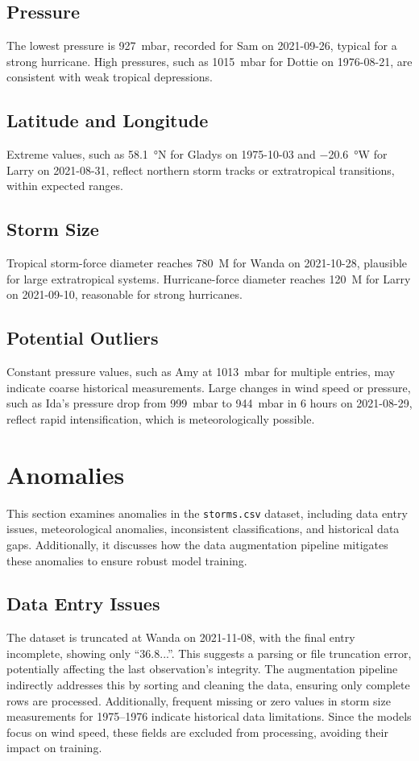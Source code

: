 \subsection{Pressure}
The lowest pressure is \SI{927}{\milli\bar}, recorded for Sam on 2021-09-26, typical for a strong hurricane. High pressures, such as \SI{1015}{\milli\bar} for Dottie on 1976-08-21, are consistent with weak tropical depressions.

\subsection{Latitude and Longitude}
Extreme values, such as \SI{58.1}{\degree}N for Gladys on 1975-10-03 and \SI{-20.6}{\degree}W for Larry on 2021-08-31, reflect northern storm tracks or extratropical transitions, within expected ranges.

\subsection{Storm Size}
Tropical storm-force diameter reaches \SI{780}{\nauticalmile} for Wanda on 2021-10-28, plausible for large extratropical systems. Hurricane-force diameter reaches \SI{120}{\nauticalmile} for Larry on 2021-09-10, reasonable for strong hurricanes.

\subsection{Potential Outliers}
Constant pressure values, such as Amy at \SI{1013}{\milli\bar} for multiple entries, may indicate coarse historical measurements. Large changes in wind speed or pressure, such as Ida’s pressure drop from \SI{999}{\milli\bar} to \SI{944}{\milli\bar} in 6 hours on 2021-08-29, reflect rapid intensification, which is meteorologically possible.

\section{Anomalies}
This section examines anomalies in the \texttt{storms.csv} dataset, including data entry issues, meteorological anomalies, inconsistent classifications, and historical data gaps. Additionally, it discusses how the data augmentation pipeline mitigates these anomalies to ensure robust model training.

\subsection{Data Entry Issues}
The dataset is truncated at Wanda on 2021-11-08, with the final entry incomplete, showing only ``36.8...''. This suggests a parsing or file truncation error, potentially affecting the last observation’s integrity. The augmentation pipeline indirectly addresses this by sorting and cleaning the data, ensuring only complete rows are processed. Additionally, frequent missing or zero values in storm size measurements for 1975--1976 indicate historical data limitations. Since the models focus on wind speed, these fields are excluded from processing, avoiding their impact on training.

